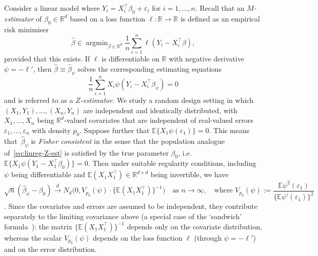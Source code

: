 \documentclass[a4paper]{article}
\newcommand{\R}{\mathbb{R}}
\newcommand{\E}{\mathbb{E}}
\newcommand{\cvd}{\overset{d}{\to}}
\DeclareMathOperator*{\argmin}{argmin}
\theoremstyle{definition}
\begin{document}
Consider a linear model where $Y_i = X_i^\top\beta_0 + \varepsilon_i$ for $i = 1,\dotsc,n$. Recall that an \textit{$M$-estimator} of $\beta_0 \in \R^d$ based on a loss function $\ell \colon \R \to \R$ is defined as an empirical risk minimiser
\begin{equation}
\label{eq:linreg-M-est}
\hat{\beta} \in \argmin_{\beta \in \R^d} \frac{1}{n}\sum_{i=1}^n \ell(Y_i - X_i^\top \beta), 
\end{equation}
provided that this exists. If $\ell$ is differentiable on $\R$ with negative derivative $\psi = -\ell'$, then $\hat{\beta} \equiv \hat{\beta}_\psi$ solves the corresponding estimating equations 
\begin{equation}
\label{eq:linreg-Z-est}
\frac{1}{n}\sum_{i=1}^n X_i\psi(Y_i - X_i^\top\hat{\beta}_\psi) = 0    
\end{equation}
and is referred to as a \textit{$Z$-estimator}. We study a random design setting in which $(X_1,Y_1),\dotsc,(X_n,Y_n)$ are independent and identically distributed, with $X_1,\dotsc,X_n$ being $\R^d$-valued covariates that are independent of real-valued errors $\varepsilon_1,\dotsc,\varepsilon_n$ with density $p_0$. Suppose further that $\E\{X_1\psi(\varepsilon_1)\} = 0$. This means that~$\hat{\beta}_\psi$ is \emph{Fisher consistent} in the sense that the population analogue of~\eqref{eq:linreg-Z-est} is satisfied by the true parameter $\beta_0$, i.e.~$\E\{X_1\psi(Y_1 - X_1^\top\beta_0)\} = 0$. Then under suitable regularity conditions, including $\psi$ being differentiable and $\E(X_1 X_1^\top) \in \R^{d \times d}$ being invertible, we have
\begin{equation}
\label{eq:M-estimator-asymp}
\sqrt{n}(\hat{\beta}_\psi - \beta_0) \cvd N_d\bigl(0, V_{p_0}(\psi) \cdot \{\E(X_1 X_1^\top)\}^{-1}\bigr) \quad \text{as }n \to \infty, \quad\text{where }V_{p_0}(\psi) := \frac{\E\psi^2(\varepsilon_1)}{\{\E\psi'(\varepsilon_1)\}^2}
\end{equation}
\citep[e.g.][Theorems~5.21,~5.23 and~5.41]{vdV1998asymptotic}. Since the covariates and errors are assumed to be independent, they contribute separately to the limiting covariance above (a special case of the `sandwich' formula~\citep{huber1967behavior,young2023sandwich}): the matrix $\{\E(X_1 X_1^\top)\}^{-1}$ depends only on the covariate distribution, whereas the scalar $V_{p_0}(\psi)$ depends on the loss function $\ell$ (through $\psi = -\ell'$) and on the error distribution.
\end{document}
